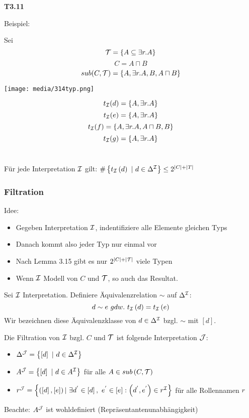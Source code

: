 \textbf{T3.11}

Beispiel:

Sei $$\mathcal{T}=\{A \subseteq \exists r.A\}$$
$$C = A \sqcap B$$
$$sub(C,\mathcal{T})=\{A, \exists r.A, B, A \sqcap B\}$$

\texttt{[image: media/314typ.png]}

$$t_{\mathcal{I}}(d)=\{A, \exists r.A\}$$
$$t_{\mathcal{I}}(e)=\{A, \exists r.A\}$$
$$t_{\mathcal{I}}(f)=\{A, \exists r.A, A \sqcap B, B\}$$
$$t_{\mathcal{I}}(g)=\{A, \exists r.A\}$$ \\

\begin{lemma}

Für jede Interpretation $\mathcal{I}$ gilt:
$\#\left\{ t_{\mathcal{I}}\left( d \right)\ |\ d \in \Delta^{\mathcal{I}} \right\} \leq 2^{\left| C \right| + |T|}$
\end{lemma}

\subsubsection{Filtration}\label{filtration}

Idee:

\begin{itemize}
  \item Gegeben Interpretation $\mathcal{I}$, indentifiziere alle Elemente gleichen Typs
  \item Danach kommt also jeder Typ nur einmal vor
  \item Nach Lemma 3.15 gibt es nur $2^{|C|+|\mathcal{T}|}$ viele Typen
  \item Wenn $\mathcal{I}$ Modell von $C$ und $\mathcal{T}$, so auch das Resultat.
\end{itemize}

\begin{definition}[Filtration]

Sei $\mathcal{I}$ Interpretation. Definiere Äquivalenzrelation $\sim$ auf
$\Delta^{\mathcal{I}}$: $$d \sim e\ gdw.\ t_{\mathcal{I}}\left( d \right) = t_{\mathcal{I}}\left( e \right)$$
Wir bezeichnen diese Äquivalenzklasse von $d \in \Delta^{\mathcal{I}}$ bzgl. $\sim$ mit $\left\lbrack d \right\rbrack$.

Die Filtration von $\mathcal{I}$ bzgl. $C$ und $\mathcal{T}$ ist folgende Interpretation $\mathcal{J}$:

\begin{itemize}
\item
  $\Delta^{\mathcal{J}} = \left\{ \left\lbrack d \right\rbrack\ |\ d \in \Delta^{\mathcal{I}} \right\}$
\item
  $A^{\mathcal{J}} = \left\{ \left\lbrack d \right\rbrack\ |\ d \in A^{\mathcal{I}} \right\}$
  für alle $A \in sub\left( C,\mathcal{T} \right)$
\item
  $r^{\mathcal{J}} = \left\{ \left( \left\lbrack d \right\rbrack,\left\lbrack e \right\rbrack \right)|\ \exists d^{'} \in \left\lbrack d \right\rbrack,\ e^{'} \in \left\lbrack e \right\rbrack:\left( d^{'},e^{'} \right) \in r^{\mathcal{I}} \right\}$
  für alle Rollennamen $r$
\end{itemize}

Beachte: $A^{\mathcal{J}}$ ist wohldefiniert (Repräsentantenunabhängigkeit)
\end{definition}

